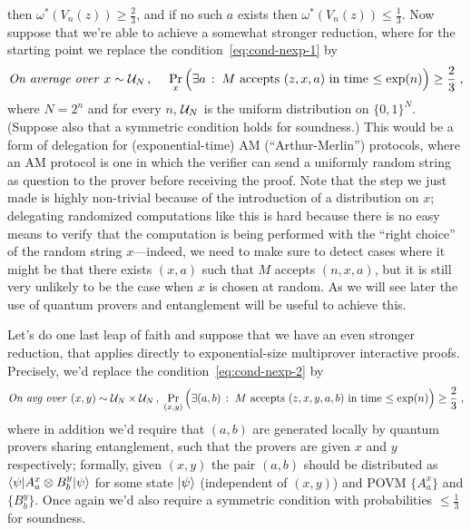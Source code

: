  then $\omega^*(V_n(z))\geq \frac{2}{3}$, and if no such $a$ exists then $\omega^*(V_n(z))\leq \frac{1}{3}$. 
Now suppose that we're able to achieve a somewhat stronger reduction, where for the starting point we replace the condition~\eqref{eq:cond-nexp-1} by
\begin{equation}\label{eq:cond-nexp-2}
\text{\emph{On average over} } x\sim \mathcal{U}_N\,,\; \quad \Pr_x\Big( \exists a\,:\;M \text{ accepts $(z,x,a)$ in time $\leq \exp(n)$}\Big)\geq \frac{2}{3}\;,
\end{equation}
where $N=2^n$ and for every $n$, $\mathcal{U}_N$ is the uniform distribution on $\{0,1\}^N$. (Suppose also that a symmetric condition holds for soundness.) This would be a form of delegation for (exponential-time) AM (``Arthur-Merlin'') protocols, where an AM protocol is one in which the verifier can send a uniformly random string as question to the prover before receiving the proof.  Note that the step we just made is highly non-trivial because of the introduction of a distribution on $x$; delegating randomized computations like this is hard because there is no easy means to verify that the computation is being performed with the ``right choice'' of the random string $x$---indeed, we need to make sure to detect cases where it might be that there exists $(x,a)$ such that $M$ accepts $(n,x,a)$, but it is still very unlikely to be the case when $x$ is chosen at random. As we will see later the use of quantum provers and entanglement will be useful to achieve this. 

Let's do one last leap of faith and suppose that we have an even stronger reduction, that applies directly to exponential-size multiprover interactive proofs. Precisely, we'd replace the condition~\eqref{eq:cond-nexp-2} by
\begin{equation}\label{eq:cond-nexp-3}
\text{\emph{On avg over} } (x,y)\sim \mathcal{U}_N\times \mathcal{U}_N\,,\;  \Pr_{(x,y)}\Big(\exists (a,b) \,: \; M \text{ accepts $(z,x,y,a,b)$ in time $\leq \exp(n)$}\Big)\geq \frac{2}{3}\;,
\end{equation}
where in addition we'd require that $(a,b)$ are generated locally by quantum provers sharing entanglement, such that the provers are given $x$ and $y$ respectively; formally, given $(x,y)$ the pair $(a,b)$ should be distributed as $\langle\psi| A^x_a \otimes B^y_b |\psi\rangle$ for some state $|\psi\rangle$ (independent of $(x,y)$) and POVM $\{A^x_a\}$ and $\{B^y_b\}$. Once again we'd also require a symmetric condition with probabilities $\leq \frac{1}{3}$ for soundness. 

